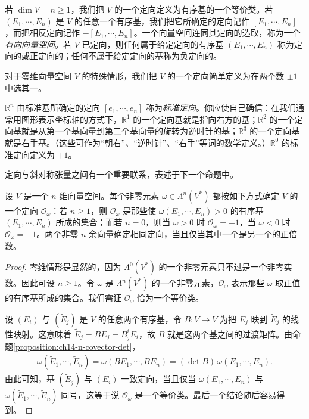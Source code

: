 \documentclass[../../main.tex]{subfiles}
\begin{document}
若 $\dim V=n\geqslant1$，我们把 $V$ 的一个定向定义为有序基的一个等价类。若 $(E_1,\cdots ,E_n)$ 是 $V$ 的任意一个有序基，我们把它所确定的定向记作 $[E_1,\cdots ,E_n]$，而把相反定向记作 $-[E_1,\cdots ,E_n]$。一个向量空间连同其定向的选取，称为一个\emph{有向向量空间}。若 $V$ 已定向，则任何属于给定定向的有序基 $(E_1,\cdots ,E_n)$ 称为定向的或正定向的；任何不属于给定定向的基称为负定向的。

对于零维向量空间 $V$ 的特殊情形，我们把 $V$ 的一个定向简单定义为在两个数 $\pm1$ 中选其一。

\begin{example}\label{example:ch15-standard-orientation}
$\mathbb{R}^n$ 由标准基所确定的定向 $[e_1,\cdots ,e_n]$ 称为\emph{标准定向}。你应使自己确信：在我们通常用图形表示坐标轴的方式下，$\mathbb{R}^1$ 的一个定向基就是指向右方的基；$\mathbb{R}^2$ 的一个定向基就是从第一个基向量到第二个基向量的旋转为逆时针的基；$\mathbb{R}^3$ 的一个定向基就是右手基。（这些可作为“朝右”、“逆时针”、“右手”等词的数学定义。）$\mathbb{R}^0$ 的标准定向定义为 $+1$。
\end{example}

定向与斜对称张量之间有一个重要联系，表述于下一个命题中。

\begin{proposition}\label{proposition:ch15-n-covector-orientation}
设 $V$ 是一个 $n$ 维向量空间。每个非零元素 $\omega\in\Lambda^n(V^*)$ 都按如下方式确定 $V$ 的一个定向 $\mathcal O_\omega$：若 $n\geqslant1$，则 $\mathcal O_\omega$ 是那些使 $\omega(E_1,\cdots ,E_n)>0$ 的有序基 $(E_1,\cdots ,E_n)$ 所成的集合；而若 $n=0$，则当 $\omega>0$ 时 $\mathcal O_\omega=+1$，当 $\omega<0$ 时 $\mathcal O_\omega=-1$。两个非零 $n$-余向量确定相同定向，当且仅当其中一个是另一个的正倍数。
\end{proposition}

\begin{proof}
零维情形是显然的，因为 $\Lambda^0(V^*)$ 的一个非零元素只不过是一个非零实数。因此可设 $n\geqslant1$。令 $\omega$ 是 $\Lambda^n(V^*)$ 的一个非零元素，$\mathcal O_\omega$ 表示那些 $\omega$ 取正值的有序基所成的集合。我们需证 $\mathcal O_\omega$ 恰为一个等价类。

设 $(E_i)$ 与 $(\widetilde E_j)$ 是 $V$ 的任意两个有序基，令 $B:V\to V$ 为把 $E_j$ 映到 $\widetilde E_j$ 的线性映射。这意味着 $\widetilde E_j=BE_j=B^i_jE_i$，故 $B$ 就是这两个基之间的过渡矩阵。由命题\ref{proposition:ch14-n-covector-det}，
\begin{align*}
\omega(\widetilde E_1,\cdots ,\widetilde E_n)
=\omega(BE_1,\cdots ,BE_n)=(\det B)\,\omega(E_1,\cdots ,E_n).
\end{align*}
由此可知，基 $(\widetilde E_j)$ 与 $(E_i)$ 一致定向，当且仅当 $\omega(E_1,\cdots ,E_n)$ 与 $\omega(\widetilde E_1,\cdots ,\widetilde E_n)$ 同号，这等于说 $\mathcal O_\omega$ 是一个等价类。最后一个结论随后容易得到。
\end{proof}
\end{document}
